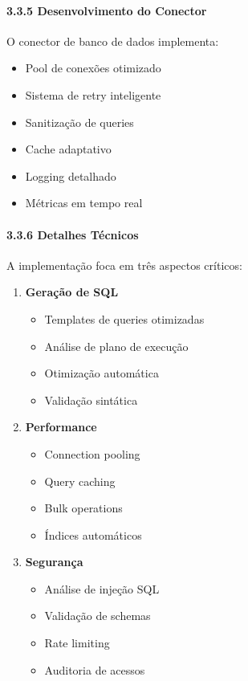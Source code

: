 \documentclass[
]{article}
\providecommand{\tightlist}{%
  \setlength{\itemsep}{0pt}\setlength{\parskip}{0pt}}
\begin{document}
\paragraph{3.3.5 Desenvolvimento do
Conector}\label{desenvolvimento-do-conector}

O conector de banco de dados implementa:

\begin{itemize}
\tightlist
\item
  Pool de conexões otimizado
\item
  Sistema de retry inteligente
\item
  Sanitização de queries
\item
  Cache adaptativo
\item
  Logging detalhado
\item
  Métricas em tempo real
\end{itemize}

\paragraph{3.3.6 Detalhes Técnicos}\label{detalhes-tuxe9cnicos-2}

A implementação foca em três aspectos críticos:

\begin{enumerate}
\def\labelenumi{\arabic{enumi}.}
\item
  \textbf{Geração de SQL}

  \begin{itemize}
  \tightlist
  \item
    Templates de queries otimizadas
  \item
    Análise de plano de execução
  \item
    Otimização automática
  \item
    Validação sintática
  \end{itemize}
\item
  \textbf{Performance}

  \begin{itemize}
  \tightlist
  \item
    Connection pooling
  \item
    Query caching
  \item
    Bulk operations
  \item
    Índices automáticos
  \end{itemize}
\item
  \textbf{Segurança}

  \begin{itemize}
  \tightlist
  \item
    Análise de injeção SQL
  \item
    Validação de schemas
  \item
    Rate limiting
  \item
    Auditoria de acessos
  \end{itemize}
\end{enumerate}
\end{document}

